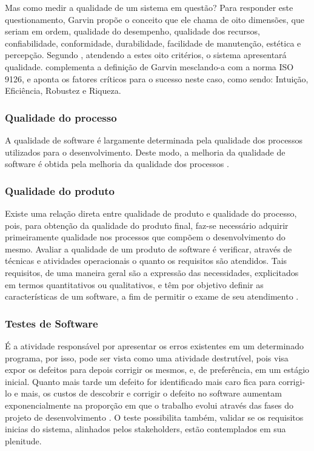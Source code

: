 \documentclass[12pt]{article}
\begin{document}
    Mas como medir a qualidade de um sistema em questão? Para responder este questionamento, Garvin \cite{garvin1987competing} propõe o conceito que ele chama de
    oito dimensões, que seriam em ordem, qualidade do desempenho, qualidade dos recursos, confiabilidade, conformidade, durabilidade, facilidade de manutenção,
    estética e percepção. Segundo \citeauthor{garvin1987competing}, atendendo a estes oito critérios, o sistema apresentará qualidade.
    \citeauthor{pressman2011engenharia} \cite{pressman2011engenharia} complementa a definição de Garvin mesclando-a com a norma ISO 9126, e aponta os fatores
    críticos para o sucesso neste caso, como sendo: Intuição, Eficiência, Robustez e Riqueza.

	
	\subsubsection{Qualidade do processo}
	
	A qualidade de software é largamente determinada pela qualidade dos processos utilizados para o desenvolvimento. Deste modo, a melhoria 
	da qualidade de software é obtida pela melhoria da qualidade dos processos \cite{koscianski2007qualidade}. 
	
	\subsubsection{Qualidade do produto}

	Existe uma relação direta entre qualidade de produto e qualidade do processo, pois, para obtenção da qualidade do produto final,
	faz-se necessário adquirir primeiramente qualidade nos processos que compõem o desenvolvimento do mesmo.
	Avaliar a qualidade de um produto de software é verificar, através de técnicas e atividades operacionais o quanto os requisitos são atendidos. Tais requisitos,
	de uma maneira geral são a expressão das necessidades, explicitados em termos quantitativos ou qualitativos, e têm por objetivo definir as características de
	um software, a fim de permitir o exame de seu atendimento \cite{koscianski2007qualidade}.
	
	\subsubsection{Testes de Software}

	É a atividade responsável por apresentar os erros existentes em um determinado programa, por isso, pode ser vista como uma atividade destrutível, pois visa expor os defeitos para depois corrigir os mesmos, e, de preferência, em um estágio inicial. Quanto mais tarde um defeito for identificado mais caro fica para corrigi-lo e mais, os custos de descobrir e corrigir o defeito no software aumentam exponencialmente na proporção em que o trabalho evolui através das fases do projeto de desenvolvimento \cite{boehm1976quantitative}. O teste possibilita também, validar se os requisitos inicias do sistema, alinhados pelos stakeholders, estão contemplados em sua plenitude.
\end{document}
